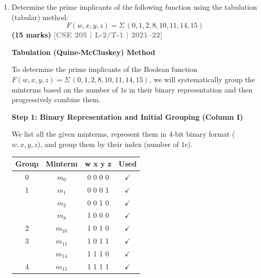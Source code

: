 \documentclass[12pt,a3paper]{article}
\newcommand{\yr}[1]{\hfill\textcolor{gray}{\small\textbf{[#1]}}}
\newcommand{\mk}[1]{\textcolor{orange!70!black}{\small\textbf{(#1 marks)}}}
\begin{document}
\begin{enumerate}
\begin{tcolorbox}[enhanced,breakable,ansbox,colback=cC!4,colframe=cC,boxrule=0.8pt,arc=5pt,title={\textbf{Answer}},fonttitle=\bfseries\color{white},colbacktitle=cC]
\vspace{0.5em}
\textbf{Final Simplified POS Expression:}
\begin{center}
\end{center}

\end{tcolorbox}

\item Determine the prime implicants of the following function using the tabulation (tabular) method:
\[ F(w, x, y, z) = \Sigma\,(0, 1, 2, 8, 10, 11, 14, 15) \]
\mk{15} \yr{CSE 205 | L-2/T-1 | 2021--22}

\begin{tcolorbox}[enhanced,breakable,ansbox,colback=cC!4,colframe=cC,boxrule=0.8pt,arc=5pt,title={\textbf{Answer}},fonttitle=\bfseries\color{white},colbacktitle=cC]

\textbf{\large Tabulation (Quine-McCluskey) Method}

To determine the prime implicants of the Boolean function $F(w, x, y, z) = \Sigma\,(0, 1, 2, 8, 10, 11, 14, 15)$, we will systematically group the minterms based on the number of $1$s in their binary representation and then progressively combine them.

\vspace{1em}
\textbf{\large Step 1: Binary Representation and Initial Grouping (Column I)}

We list all the given minterms, represent them in 4-bit binary format ($w, x, y, z$), and group them by their index (number of $1$s).

\begin{center}
\begin{tabular}{cccc}
\toprule
\textbf{Group} & \textbf{Minterm} & \textbf{w x y z} & \textbf{Used} \\
\midrule
0 & $m_0$  & 0 0 0 0 & $\checkmark$ \\
\midrule
1 & $m_1$  & 0 0 0 1 & $\checkmark$ \\
  & $m_2$  & 0 0 1 0 & $\checkmark$ \\
  & $m_8$  & 1 0 0 0 & $\checkmark$ \\
\midrule
2 & $m_{10}$ & 1 0 1 0 & $\checkmark$ \\
\midrule
3 & $m_{11}$ & 1 0 1 1 & $\checkmark$ \\
  & $m_{14}$ & 1 1 1 0 & $\checkmark$ \\
\midrule
4 & $m_{15}$ & 1 1 1 1 & $\checkmark$ \\
\bottomrule
\end{tabular}
\end{center}


\end{tcolorbox}
\end{enumerate}
\end{document}
